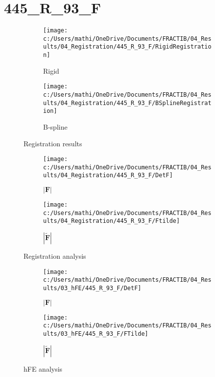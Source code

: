 \documentclass{article}%
\begin{document}
%
\newpage%
\section*{445\_R\_93\_F}%
\label{sec:445R93F}%


\begin{figure}[h!]%
\begin{subfigure}[b]{0.5\linewidth}%
\texttt{[image: c:/Users/mathi/OneDrive/Documents/FRACTIB/04\_Results/04\_Registration/445\_R\_93\_F/RigidRegistration]}%
\caption{Rigid}%
\end{subfigure}%
\begin{subfigure}[b]{0.5\linewidth}%
\texttt{[image: c:/Users/mathi/OneDrive/Documents/FRACTIB/04\_Results/04\_Registration/445\_R\_93\_F/BSplineRegistration]}%
\caption{B{-}spline}%
\end{subfigure}%
\caption{Registration results}%
\end{figure}

%


\begin{figure}[h!]%
\begin{subfigure}[b]{0.5\linewidth}%
\texttt{[image: c:/Users/mathi/OneDrive/Documents/FRACTIB/04\_Results/04\_Registration/445\_R\_93\_F/DetF]}%
\caption{$|\mathbf{F}|$}%
\end{subfigure}%
\begin{subfigure}[b]{0.5\linewidth}%
\texttt{[image: c:/Users/mathi/OneDrive/Documents/FRACTIB/04\_Results/04\_Registration/445\_R\_93\_F/Ftilde]}%
\caption{$|\widetilde{\mathbf{F}}|$}%
\end{subfigure}%
\caption{Registration analysis}%
\end{figure}

%


\begin{figure}[h!]%
\begin{subfigure}[b]{0.5\linewidth}%
\texttt{[image: c:/Users/mathi/OneDrive/Documents/FRACTIB/04\_Results/03\_hFE/445\_R\_93\_F/DetF]}%
\caption{$|\mathbf{F}|$}%
\end{subfigure}%
\begin{subfigure}[b]{0.5\linewidth}%
\texttt{[image: c:/Users/mathi/OneDrive/Documents/FRACTIB/04\_Results/03\_hFE/445\_R\_93\_F/FTilde]}%
\caption{$|\widetilde{\mathbf{F}}|$}%
\end{subfigure}%
\caption{hFE analysis}%
\end{figure}
\end{document}
